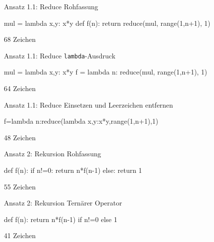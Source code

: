 \documentclass[xcolor=dvipsnames, aspectratio=43, 14pt]{beamer}
\begin{document}
\begin{frame}[fragile]{Ansatz 1.1: Reduce}
	Rohfassung
	
	\vfill
	
	\begin{python3code}
	mul = lambda x,y: x*y
	def f(n):
	   return reduce(mul, range(1,n+1), 1)
	\end{python3code}
	
	\vfill
	
	68 Zeichen
\end{frame}

\begin{frame}[fragile]{Ansatz 1.1: Reduce}
	\texttt{lambda}-Ausdruck
	
	\vfill
	
	\begin{python3code}
	mul = lambda x,y: x*y
	f = lambda n: reduce(mul, range(1,n+1), 1)
	\end{python3code}
	
	\vfill
	
	64 Zeichen
\end{frame}

\begin{frame}[fragile]{Ansatz 1.1: Reduce}
	Einsetzen und Leerzeichen entfernen
	
	\vfill
	
	\begin{python3code}
	f=lambda n:reduce(lambda x,y:x*y,range(1,n+1),1)
	\end{python3code}
	
	\vfill
	
	48 Zeichen
\end{frame}

\begin{frame}[fragile]{Ansatz 2: Rekursion}
	Rohfassung
	
	\vfill
	
	\begin{python3code}
	def f(n):
	   if n!=0:
	      return n*f(n-1)
	   else:
	      return 1
	\end{python3code}
	\vfill
	
	55 Zeichen
\end{frame}

\begin{frame}[fragile]{Ansatz 2: Rekursion}
	Ternärer Operator
	
	\vfill
	
	\begin{python3code}
	def f(n):
	   return n*f(n-1) if n!=0 else 1
	\end{python3code}
	\vfill
	
	41 Zeichen
\end{frame}
\end{document}
